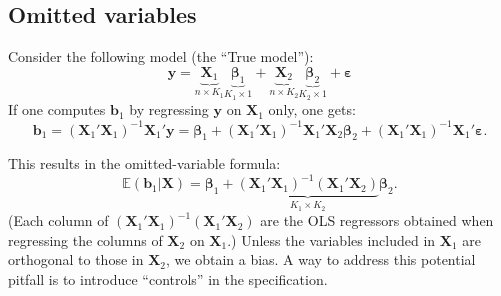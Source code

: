 \documentclass[
  12pt,
]{book}
\theoremstyle{definition}
\theoremstyle{definition}
\theoremstyle{definition}
\theoremstyle{definition}
\theoremstyle{remark}
\begin{document}
\hypertarget{Omitted}{%
\subsection{Omitted variables}\label{Omitted}}

Consider the following model (the ``True model''):
\[
\mathbf{y} = \underbrace{\mathbf{X}_1}_{n \times K_1}\underbrace{\boldsymbol\beta_1}_{K_1 \times 1} + \underbrace{\mathbf{X}_2}_{n\times K_2}\underbrace{\boldsymbol\beta_2}_{K_2 \times 1} + \boldsymbol\varepsilon
\]
If one computes \(\mathbf{b}_1\) by regressing \(\mathbf{y}\) on \(\mathbf{X}_1\) only, one gets:
\[
\mathbf{b}_1 = (\mathbf{X}_1'\mathbf{X}_1)^{-1}\mathbf{X}_1'\mathbf{y} = \boldsymbol\beta_1 + (\mathbf{X}_1'\mathbf{X}_1)^{-1}\mathbf{X}_1'\mathbf{X}_2\boldsymbol\beta_2 + 
(\mathbf{X}_1'\mathbf{X}_1)^{-1}\mathbf{X}_1'\boldsymbol\varepsilon.
\]

This results in the omitted-variable formula:
\[
\mathbb{E}(\mathbf{b}_1|\mathbf{X}) = \boldsymbol\beta_1 + \underbrace{(\mathbf{X}_1'\mathbf{X}_1)^{-1}(\mathbf{X}_1'\mathbf{X}_2)}_{K_1 \times K_2}\boldsymbol\beta_2.
\]
(Each column of \((\mathbf{X}_1'\mathbf{X}_1)^{-1}(\mathbf{X}_1'\mathbf{X}_2)\) are the OLS regressors obtained when regressing the columns of \(\mathbf{X}_2\) on \(\mathbf{X}_1\).) Unless the variables included in \(\mathbf{X}_1\) are orthogonal to those in \(\mathbf{X}_2\), we obtain a bias. A way to address this potential pitfall is to introduce ``controls'' in the specification.
\end{document}
